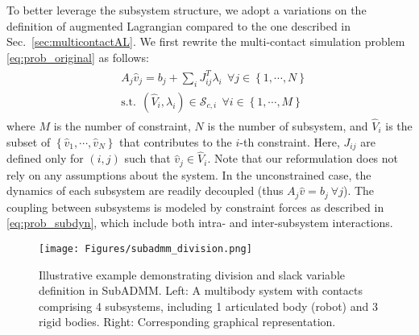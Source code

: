 \documentclass[lettersize,journal]{IEEEtran}
\begin{document}
To better leverage the subsystem structure, we adopt a variations on the definition of augmented Lagrangian compared to the one described in Sec.~\ref{sec:multicontactAL}.
We first rewrite the multi-contact simulation problem \eqref{eq:prob_original} as follows:
\begin{align} \label{eq:prob_subdyn}
\begin{split}
    &A_j\hat{v}_j = b_j + \sum_i J_{ij}^T\lambda_{i}~~\forall j\in\left\{1,\cdots,N\right\} \\
    &\text{s.t.}~~(\hat{V}_i,\lambda_i) \in \mathcal{S}_{c,i}~~\forall i\in\left\{1,\cdots,M\right\}
\end{split}
\end{align}
where $M$ is the number of constraint, $N$ is the number of subsystem, and $\hat{V}_i$ is the subset of $\left\{\hat{v}_1,\cdots,\hat{v}_N\right\}$ that contributes to the $i$-th constraint.   
Here, $J_{ij}$ are defined only for $(i,j)$ such that $\hat{v}_j\in\hat{V}_i$. 
Note that our reformulation does not rely on any assumptions about the system. In the unconstrained case, the dynamics of each subsystem are readily decoupled (thus $A_j\hat{v} = b_j~\forall j$). The coupling between subsystems is modeled by constraint forces as described in \eqref{eq:prob_subdyn}, which include both intra- and inter-subsystem interactions.

\begin{figure}[t]
\centering
\texttt{[image: Figures/subadmm\_division.png]}
\caption{Illustrative example demonstrating division and slack variable definition in SubADMM. Left: A multibody system with contacts comprising 4 subsystems, including 1 articulated body (robot) and 3 rigid bodies. Right: Corresponding graphical representation.}
\label{fig:subadmm_division}
\end{figure}
\end{document}
